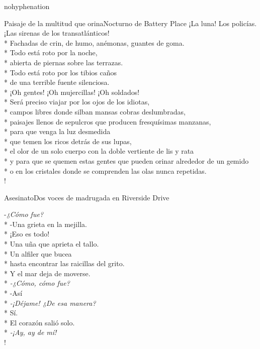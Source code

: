 \documentclass[
    a5paper,
    DIV=10,
    12pt,
    notitlepage,
    oneside,]
{scrbook} %
\begin{document}
\begin{hyphenrules}{nohyphenation}
\begin{poem}{Paisaje de la multitud que orina}{Nocturno de Battery Place}{}
¡La luna! Los policías. ¡Las sirenas de los transatlánticos! \\*
Fachadas de crin, de humo, anémonas, guantes de goma.\\*
Todo está roto por la noche,\\*
abierta de piernas sobre las terrazas.\\*
Todo está roto por los tibios caños\\*
de una terrible fuente silenciosa.\\*
¡Oh gentes! ¡Oh mujercillas! ¡Oh soldados!\\*
Será preciso viajar por los ojos de los idiotas,\\*
campos libres donde silban mansas cobras deslumbradas,\\*
paisajes llenos de sepulcros que producen fresquísimas manzanas,\\*
\vspace{-1em}para que venga la luz desmedida\\*
que temen los ricos detrás de sus lupas,\\*
el olor de un solo cuerpo con la doble vertiente de lis y rata\\*
y para que se quemen estas gentes que pueden orinar alrededor de un gemido\\*
o en los cristales donde se comprenden las olas nunca repetidas.\\!

\end{poem}

\begin{poem}{Asesinato}{Dos voces de madrugada en Riverside Drive}{}

-\emph{¿Cómo fue?}\\*
-Una grieta en la mejilla.\\*
¡Eso es todo!\\*
Una uña que aprieta el tallo.\\*
Un alfiler que bucea\\*
hasta encontrar las raicillas del grito.\\*
Y el mar deja de moverse.\\*
\emph{-¿Cómo, cómo fue? }\\*
-Así\\*
\emph{-¡Déjame! ¿De esa manera? }\\*
Sí.\\*
El corazón salió solo.\\*
\emph{-¡Ay, ay de mí!} \\!


\end{poem}
\end{hyphenrules}
\end{document}
